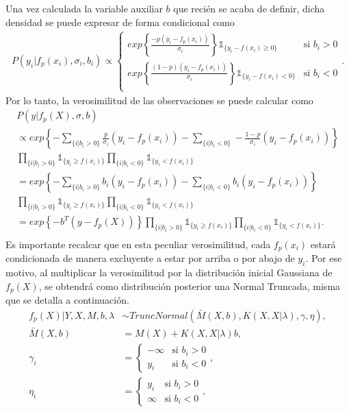 Una vez calculada la variable auxiliar $b$ que reci\'en se acaba de definir, dicha densidad se puede expresar de forma condicional como
\begin{gather*}
    P(y_i | f_p(x_i),\sigma_i,b_i) \propto
    \begin{cases}
        exp \left\{
            \frac{-p(y_i-f_p(x_i))}{\sigma_i}
        \right\} \mathds{1}_{\{y_i - f(x_i) \geq 0\}} 
        &\text{si } b_i > 0\\
        exp \left\{
            \frac{(1-p)(y_i-f_p(x_i))}{\sigma_i}
        \right\} \mathds{1}_{\{y_i - f(x_i) < 0\}} 
        &\text{si } b_i < 0\\
    \end{cases}.
\end{gather*}
Por lo tanto, la verosimilitud de las observaciones se puede calcular como
\begin{gather*}
    P(y | f_p(X),\sigma,b) \\
    \propto exp \left\{
        -\sum_{\{i|b_i > 0\}} \frac{p}{\sigma_i}(y_i-f_p(x_i)) -
        \sum_{\{i|b_i < 0\}} -\frac{1-p}{\sigma_i}(y_i-f_p(x_i))
    \right\} \\
    \prod_{\{i|b_i > 0\}}\mathds{1}_{\{y_i \geq f(x_i)\}}
    \prod_{\{i|b_i < 0\}}\mathds{1}_{\{y_i < f(x_i)\}}\\
    = exp \left\{
        -\sum_{\{i|b_i > 0\}} b_i(y_i-f_p(x_i)) -
        \sum_{\{i|b_i < 0\}} b_i(y_i-f_p(x_i))
    \right\} \\
    \prod_{\{i|b_i > 0\}}\mathds{1}_{\{y_i \geq f(x_i)\}}
    \prod_{\{i|b_i < 0\}}\mathds{1}_{\{y_i < f(x_i)\}}\\
    = exp \left\{-b^T(y-f_p(X))
    \right\}
    \prod_{\{i|b_i > 0\}}\mathds{1}_{\{y_i \geq f(x_i)\}}
    \prod_{\{i|b_i < 0\}}\mathds{1}_{\{y_i < f(x_i)\}}.\\
\end{gather*}
Es importante recalcar que en esta peculiar verosimilitud, cada $f_p(x_i)$ estar\'a condicionada de manera excluyente a estar por arriba o por abajo de $y_i$. Por ese motivo, al multiplicar la verosimilitud por la distribuci\'on inicial Gaussiana de $f_p(X)$, se obtendr\'a como distribuci\'on posterior una Normal Truncada, misma que se detalla a continuaci\'on.
\begin{equation*}
\begin{aligned}
   f_p(X)|Y,X,M,b,\lambda &\sim TruncNormal(\bar{M}(X,b), K(X,X|\lambda), \gamma, \eta), \\
   \bar{M}(X,b) &= M(X) + K(X,X|\lambda)b, \\
   \gamma_i &= 
   \begin{cases}
    -\infty & \text{si }b_i > 0 \\
    y_i & \text{si }b_i < 0
   \end{cases},\\
   \eta_i &= 
   \begin{cases}
    y_i & \text{si }b_i > 0 \\
    \infty & \text{si }b_i < 0
   \end{cases},
\end{aligned}
\end{equation*}
